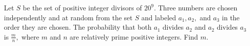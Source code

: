 Let $S$ be the set of positive integer divisors of $20^9.$ Three numbers are chosen independently and at random from the set $S$ and labeled $a_1,a_2,$ and $a_3$ in the order they are chosen. The probability that both $a_1$ divides $a_2$ and $a_2$ divides $a_3$ is $\frac mn,$ where $m$ and $n$ are relatively prime positive integers. Find $m.$